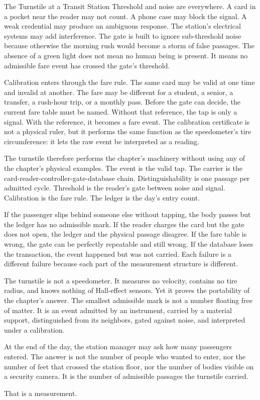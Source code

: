 \begin{coda}{The Turnstile at a Transit Station}
Threshold and noise are everywhere. A card in a pocket near the reader may not
count. A phone case may block the signal. A weak credential may produce an
ambiguous response. The station's electrical systems may add interference. The
gate is built to ignore sub-threshold noise because otherwise the morning rush
would become a storm of false passages. The absence of a green light does not
mean no human being is present. It means no admissible fare event has crossed
the gate's threshold.

Calibration enters through the fare rule. The same card may be valid at one
time and invalid at another. The fare may be different for a student, a senior,
a transfer, a rush-hour trip, or a monthly pass. Before the gate can decide, the
current fare table must be named. Without that reference, the tap is only a
signal. With the reference, it becomes a fare event. The calibration certificate
is not a physical ruler, but it performs the same function as the speedometer's
tire circumference: it lets the raw event be interpreted as a reading.

The turnstile therefore performs the chapter's machinery without using any of
the chapter's physical examples. The event is the valid tap. The carrier is the
card-reader-controller-gate-database chain. Distinguishability is one passage
per admitted cycle. Threshold is the reader's gate between noise and signal.
Calibration is the fare rule. The ledger is the day's entry count.

If the passenger slips behind someone else without tapping, the body passes but
the ledger has no admissible mark. If the reader charges the card but the gate
does not open, the ledger and the physical passage disagree. If the fare table
is wrong, the gate can be perfectly repeatable and still wrong. If the database
loses the transaction, the event happened but was not carried. Each failure is a
different failure because each part of the measurement structure is different.

The turnstile is not a speedometer. It measures no velocity, contains no tire
radius, and knows nothing of Hall-effect sensors. Yet it proves the portability
of the chapter's answer. The smallest admissible mark is not a number floating
free of matter. It is an event admitted by an instrument, carried by a material
support, distinguished from its neighbors, gated against noise, and interpreted
under a calibration.

At the end of the day, the station manager may ask how many passengers entered.
The answer is not the number of people who wanted to enter, nor the number of
feet that crossed the station floor, nor the number of bodies visible on a
security camera. It is the number of admissible passages the turnstile carried.

That is a measurement.

\end{coda}
